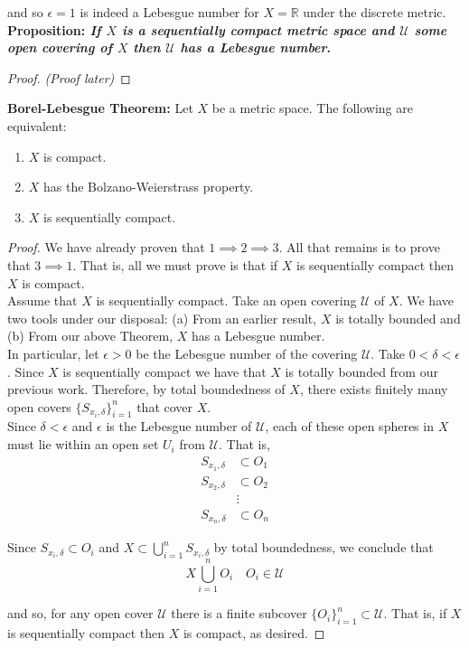 \documentclass[12pt]{article}
\newlength\tindent
\renewcommand{\indent}{\hspace*{\tindent}}
\newcommand{\R}{\mathbb R}
\begin{document}
and so $\epsilon = 1$ is indeed a Lebesgue number for $X = \R$ under the discrete metric. \\

%
% 
{\bf Proposition: {\em If $X$ is a sequentially compact metric space and $\mathcal U$ some open covering of $X$ then $\mathcal U$ has a Lebesgue number}.}
\begin{proof} {\em (Proof later)}
\end{proof}

%
%
{\bf Borel-Lebesgue Theorem:} Let $X$ be a metric space. The following are equivalent:
\begin{enumerate}
	\item $X$ is compact.
	\item $X$ has the Bolzano-Weierstrass property.
	\item $X$ is sequentially compact.
\end{enumerate}

\begin{proof} We have already proven that $1 \implies 2 \implies 3$. All that remains is to prove that $3 \implies 1$. That is, all we must prove is that if $X$ is sequentially compact then $X$ is compact. \\

\indent Assume that $X$ is sequentially compact. Take an open covering $\mathcal U$ of $X$. We have two tools under our disposal: (a) From an earlier result, $X$ is totally bounded and (b) From our above Theorem, $X$ has a Lebesgue number. \\

\indent In particular, let $\epsilon > 0$ be the Lebesgue number of the covering $\mathcal U$. Take $0 < \delta < \epsilon$. Since $X$ is sequentially compact we have that $X$ is totally bounded from our previous work. Therefore, by total boundedness of $X$, there exists finitely many open covers $\{S_{x_i,\delta}\}^n_{i = 1}$ that cover $X$. \\

\indent Since $\delta < \epsilon$ and $\epsilon$ is the Lebesgue number of $\mathcal U$, each of these open spheres in $X$ must lie within an open set $U_i$ from $\mathcal U$. That is,
\begin{align*}
	S_{x_1,\delta} &\subset O_1 \\
	S_{x_2,\delta} &\subset O_2 \\
	&\vdots \\
	S_{x_n,\delta} &\subset O_n
\end{align*}

Since $S_{x_i,\delta} \subset O_i$ and $X \subset \bigcup^n_{i = 1} S_{x_i,\delta}$ by total boundedness, we conclude that
\begin{equation*}
	X \bigcup^n_{i = 1} O_i \quad O_i \in \mathcal U
\end{equation*}

and so, for any open cover $\mathcal U$ there is a finite subcover $\{O_i\}^n_{i = 1} \subset \mathcal U$. That is, if $X$ is sequentially compact then $X$ is compact, as desired.
\end{proof}
\end{document}
